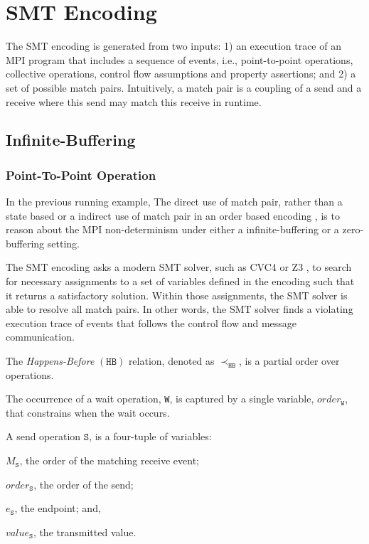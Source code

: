 \section{SMT Encoding}
The SMT encoding is generated from two inputs: 1) an execution trace of an MPI program that includes a sequence of events, i.e., point-to-point operations, collective operations, control flow assumptions and property assertions; and 2) a set of possible match pairs. Intuitively, a match pair is a coupling of a send and a receive where this send may match this receive in runtime. 

\subsection{Infinite-Buffering}
\subsubsection{Point-To-Point Operation}
In the previous running example,   
The direct use of match pair, rather than a state based \cite{} or a indirect use of match pair in an order based encoding \cite{}, is 
to reason about the MPI non-determinism under either a infinite-buffering or a zero-buffering setting. 

The SMT encoding asks a modern SMT solver, such as CVC4 \cite{} or Z3 \cite{}, to search for necessary assignments to a set of variables defined in the encoding such that it returns a satisfactory solution. Within those assignments, the SMT solver is able to resolve all match pairs. In other words, the SMT solver finds a violating execution trace of events that follows the control flow and message communication.   


\begin{definition}
The \emph{Happens-Before} $(\mathtt{HB})$ relation, denoted as
$\mathrm{\prec_\mathtt{HB}}$, is a partial order over operations.
\label{def:hb}
\end{definition}

\begin{definition}[Wait] \label{def:event}
The occurrence of a wait operation, \texttt{W}, is captured by a
single variable, $\mathit{order}_\mathtt{W}$, that constrains when
the wait occurs.
\end{definition}

\begin{definition}[Send] \label{def:snd}
A send operation $\mathtt{S}$, is a four-tuple of variables:
\begin{compactenum}
\item $M_\mathtt{S}$, the order of the matching receive event;
\item $\mathit{order}_\mathtt{S}$, the order of the send;
\item $e_\mathtt{S}$, the endpoint; and,
\item $\mathit{value}_\mathtt{S}$, the transmitted value.
\end{compactenum}
\end{definition}

